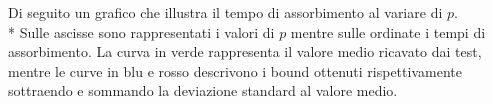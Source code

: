 \documentclass[../Tesi.tex]{subfiles}
\begin{document}
Di seguito un grafico che illustra il tempo di assorbimento al variare di $p$.\\*
Sulle ascisse sono rappresentati i valori di $p$ mentre sulle ordinate i tempi di assorbimento. La curva in verde rappresenta il valore medio ricavato dai test, mentre le curve in blu e rosso descrivono i bound ottenuti rispettivamente sottraendo e sommando la deviazione standard al valore medio.
\end{document}
